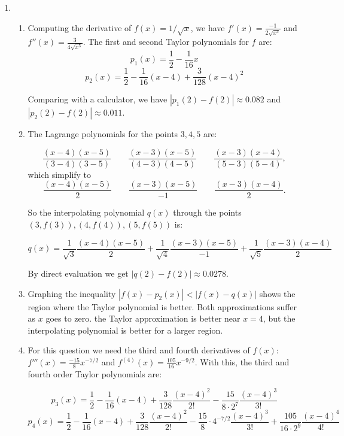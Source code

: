\begin{enumerate}
	\item \begin{enumerate}
		      \item Computing the derivative of $f(x) = 1/\sqrt{x}$, we have $f'(x) = \frac{-1}{2\sqrt{x^3}}$ and $f''(x) = \frac{3}{4\sqrt{x^5}}$.
		            The first and second Taylor polynomials for $f$ are:
		            \[p_1(x) = \frac{1}{2} -\frac{1}{16}x\]
		            \[p_2(x) = \frac{1}{2} -\frac{1}{16}(x-4) + \frac{3}{128}(x-4)^2\]

		            Comparing with a calculator, we have $|p_1(2) - f(2)| \approx 0.082$ and $|p_2(2) - f(2)| \approx 0.011$.

		      \item The Lagrange polynomials for the points $3,4,5$ are:

		            \[
			            \frac{(x-4)(x-5)}{(3-4)(3-5)}\qquad \frac{(x-3)(x-5)}{(4-3)(4-5)}
			            \qquad \frac{(x-3)(x-4)}{(5-3)(5-4)},
		            \]
		            which simplify to
		            \[
			            \frac{(x-4)(x-5)}{2}\qquad \frac{(x-3)(x-5)}{-1}\qquad \frac{(x-3)(x-4)}{2}.
		            \]

		            So the interpolating polynomial $q(x)$ through the points $(3,f(3)),(4,f(4)),(5,f(5))$ is:

		            \[q(x) = \frac{1}{\sqrt{3}}\frac{(x-4)(x-5)}{2} + \frac{1}{\sqrt{4}}\frac{(x-3)(x-5)}{-1} + \frac{1}{\sqrt{5}}\frac{(x-3)(x-4)}{2}\]

		            By direct evaluation we get $|q(2)-f(2)| \approx 0.0278$.

		      \item Graphing the inequality $|f(x) - p_2(x)| < |f(x) - q(x)|$ shows the region where the Taylor polynomial is better. Both approximations suffer as $x$ goes to zero. the Taylor approximation is better near $x=4$, but the interpolating polynomial is better for a larger region.

		      \item For this question we need the third and fourth derivatives of $f(x)$: $f'''(x) = \frac{-15}{8}x^{-7/2}$ and $f^{(4)}(x) = \frac{105}{16}x^{-9/2}$. With this, the third and fourth order Taylor polynomials are:

                \[p_3(x) = \frac{1}{2} -\frac{1}{16}(x-4) + \frac{3}{128}\frac{(x-4)^2}{2!} -\frac{15}{8\cdot 2^7} \frac{(x-4)^3}{3!}\]
                \[p_4(x) = \frac{1}{2} -\frac{1}{16}(x-4) + \frac{3}{128}\frac{(x-4)^2}{2!} -\frac{15}{8}\cdot 4^{-7/2}\frac{(x-4)^3}{3!} + \frac{105}{16 \cdot 2^9}\frac{(x-4)^4}{4!}\]


\end{enumerate}
\end{enumerate}

